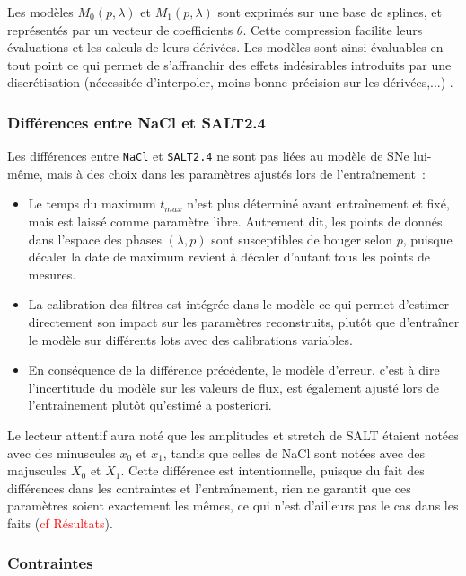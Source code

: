 \documentclass{book}
\def\nacl{\texttt{NaCl}\xspace}
\def\saltd{\texttt{SALT2.4}\xspace}
\begin{document}
Les modèles $M_0(p, \lambda)$ et $M_1(p, \lambda)$ sont exprimés sur une base de splines, et représentés par un vecteur de coefficients $\theta$. Cette compression facilite leurs évaluations et les calculs de leurs dérivées. Les modèles sont ainsi évaluables en tout point ce qui permet de s'affranchir des effets indésirables introduits par une discrétisation (nécessitée d'interpoler, moins bonne précision sur les dérivées,...) .

\subsubsection{Différences entre NaCl et SALT2.4}

Les différences entre \nacl et \saltd ne sont pas liées au modèle de SNe lui-même, mais à des choix dans les paramètres ajustés lors de l'entraînement~:
\begin{itemize}
\item Le temps du maximum $t_{max}$ n'est plus déterminé avant entraînement et fixé, mais est laissé comme paramètre libre. Autrement dit, les points de donnés dans l'espace des phases $(\lambda, p)$ sont susceptibles de bouger selon $p$, puisque décaler la date de maximum revient à décaler d'autant tous les points de mesures.
\item La calibration des filtres est intégrée dans le modèle ce qui permet d'estimer directement son impact sur les paramètres reconstruits, plutôt que d'entraîner le modèle sur différents lots avec des calibrations variables.
\item En conséquence de la différence précédente, le modèle d'erreur, c'est à dire l'incertitude du modèle sur les valeurs de flux, est également ajusté lors de l'entraînement plutôt qu'estimé a posteriori.
\end{itemize}
Le lecteur attentif aura noté que les amplitudes et stretch de SALT étaient notées avec des minuscules $x_0$ et $x_1$, tandis que celles de NaCl sont notées avec des majuscules $X_0$ et $X_1$. Cette différence est intentionnelle, puisque du fait des différences dans les contraintes et l'entraînement, rien ne garantit que ces paramètres soient exactement les mêmes, ce qui n'est d'ailleurs pas le cas dans les faits (\textcolor{red}{cf Résultats}).

\subsubsection{Contraintes}
\end{document}
